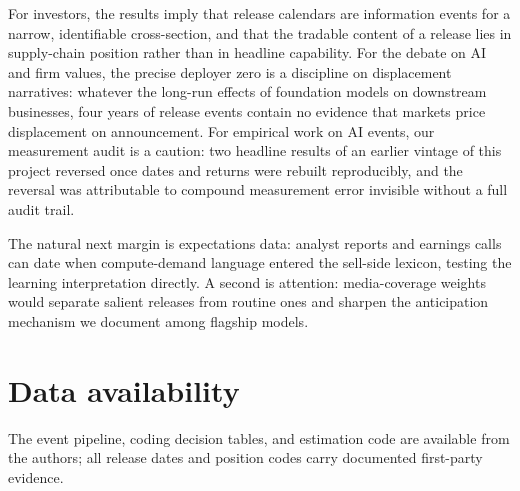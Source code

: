 \documentclass[review,12pt,authoryear]{elsarticle}
\begin{document}
For investors, the results imply that release calendars are information
events for a narrow, identifiable cross-section, and that the tradable
content of a release lies in supply-chain position rather than in headline
capability. For the debate on AI and firm values, the precise deployer zero
is a discipline on displacement narratives: whatever the long-run effects of
foundation models on downstream businesses, four years of release events
contain no evidence that markets price displacement on announcement. For
empirical work on AI events, our measurement audit is a caution: two
headline results of an earlier vintage of this project reversed once dates
and returns were rebuilt reproducibly, and the reversal was attributable to
compound measurement error invisible without a full audit trail.

The natural next margin is expectations data: analyst reports and earnings
calls can date when compute-demand language entered the sell-side lexicon,
testing the learning interpretation directly. A second is attention:
media-coverage weights would separate salient releases from routine ones and
sharpen the anticipation mechanism we document among flagship models.

\section*{Data availability}
The event pipeline, coding decision tables, and estimation code are available
from the authors; all release dates and position codes carry documented
first-party evidence.
\end{document}
